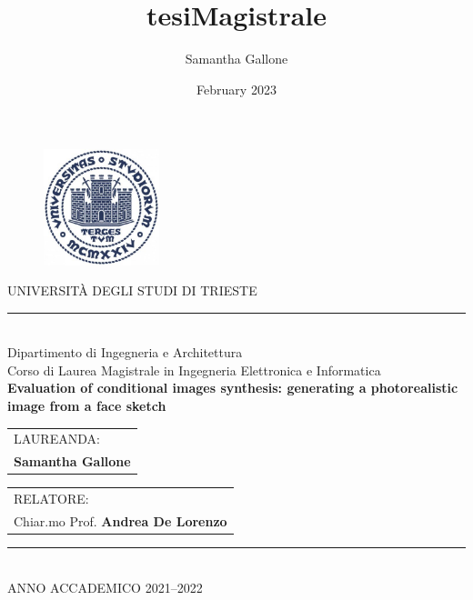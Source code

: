 \documentclass[paper=a4, fontsize=14pt, titlepage, oneside]{article}
\title{tesiMagistrale}
\author{Samantha Gallone}
\date{February 2023}
\begin{document}
\thispagestyle{empty}
\setcounter{page}{0}

 \begin{figure}[htbp]
	\centering
	\includegraphics[width=%
	 0.3\textwidth]{figures/logo_units.jpg}
	\end{figure}
\begin{center}

\LARGE
UNIVERSIT\`A DEGLI STUDI DI TRIESTE\\
\vspace{-0.4cm}
\rule{8cm}{0.2mm}\\
\Large
Dipartimento di Ingegneria e Architettura\\
\bigskip
\large
Corso di Laurea Magistrale in Ingegneria Elettronica e Informatica \\
\vfill %
{}
\huge{\textbf{Evaluation of conditional images synthesis: generating a photorealistic image from a face sketch}}\\
\vfill %
{}
\end{center}
\vfill
%
\begin{tabular}[t]{l}
LAUREANDA:\\
\large
\textbf{Samantha Gallone}
\end{tabular}
\hfill 
%
\begin{tabular}[t]{l}
RELATORE: \\
\large
Chiar.mo Prof. \textbf{Andrea De Lorenzo}
\end{tabular}
\vfill
\begin{center}
\normalsize
\rule{8cm}{0.1mm}\\
\bigskip
ANNO ACCADEMICO 2021--2022
\end{center}
\end{document}
